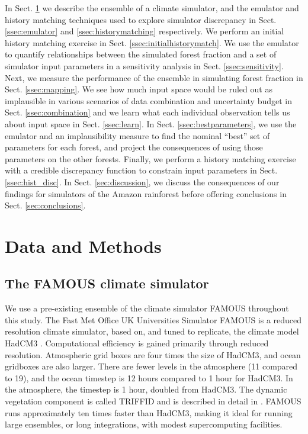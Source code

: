 \documentclass[esd, manuscript]{copernicus}
\begin{document}
In Sect. \ref{sec:dataandmethods} we describe the ensemble of a climate simulator, and the emulator and history matching techniques used to explore simulator discrepancy in Sect. \ref{ssec:emulator} and \ref{ssec:historymatching} respectively. We perform an initial history matching exercise in Sect. \ref{ssec:initialhistorymatch}. We use the emulator to quantify relationships between the simulated forest fraction and a set of  simulator input parameters in a sensitivity analysis in Sect. \ref{ssec:sensitivity}. Next, we measure the performance of the ensemble in simulating forest fraction in Sect. \ref{ssec:mapping}. We see how much input space would be ruled out as implausible in various scenarios of data combination and uncertainty budget in Sect. \ref{ssec:combination} and we learn what each individual observation tells us about input space in Sect. \ref{ssec:learn}. In Sect. \ref{ssec:bestparameters}, we use the emulator and an implausibility measure to find the nominal ``best'' set of parameters for each forest, and project the consequences of using those parameters on the other forests. Finally, we perform a history matching exercise with a credible discrepancy function to constrain input parameters in Sect. \ref{ssec:hist_disc}. In Sect. \ref{sec:discussion}, we discuss the consequences of our findings for simulators of the Amazon rainforest before offering conclusions in Sect. \ref{sec:conclusions}.


\section{Data and Methods}\label{sec:dataandmethods}

\subsection{The FAMOUS climate simulator}\label{subsec:FAMOUS}

We use a pre-existing ensemble of the climate simulator FAMOUS throughout this study. The Fast Met Office UK Universities Simulator FAMOUS \citep{jones2005systematic,smith2008famous} is a reduced resolution climate simulator, based on, and tuned to replicate, the climate model HadCM3 \citep{gordon2000simulation,pope2000impact}. Computational efficiency is gained primarily through reduced resolution. Atmospheric grid boxes are four times the size of HadCM3, and ocean gridboxes are also larger. There are fewer levels in the atmosphere (11 compared to 19), and the ocean timestep is 12 hours compared to 1 hour for HadCM3. In the atmosphere, the timestep is 1 hour, doubled from HadCM3. The dynamic vegetation component is called TRIFFID and is described in detail in \cite{cox2001description}. FAMOUS runs approximately ten times faster than HadCM3, making it ideal for running large ensembles, or long integrations, with modest supercomputing facilities.
\end{document}
